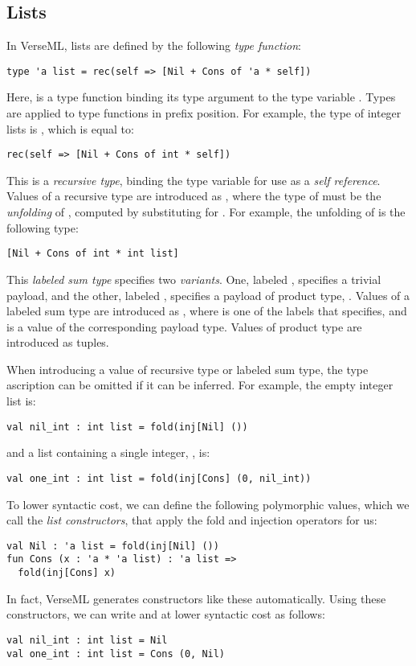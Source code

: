 \subsection{Lists}\label{sec:lists}
In VerseML, lists are defined by the following \emph{type function}:
\begin{lstlisting}[numbers=none]
type 'a list = rec(self => [Nil + Cons of 'a * self])
\end{lstlisting}
Here,  is a {type function} binding its type argument to the type variable . Types are applied to type functions in prefix position. For example, the type of integer lists is , which is equal to:
\begin{lstlisting}[numbers=none]
rec(self => [Nil + Cons of int * self])
\end{lstlisting}
This is a \emph{recursive type}, binding the type variable  for use as a \emph{self reference}. Values of a recursive type  are introduced as , where the type of  must be the \emph{unfolding} of , computed by substituting  for . For example, the unfolding of  is the following type:
\begin{lstlisting}[numbers=none]
[Nil + Cons of int * int list]
\end{lstlisting}
This \emph{labeled sum type} specifies two \emph{variants}. One, labeled , specifies a trivial payload, and the other, labeled , specifies a payload of product type, . Values of a labeled sum type  are introduced as , where  is one of the labels that  specifies, and  is a value of the corresponding payload type. Values of product type are introduced as tuples.

When introducing a value of recursive type or labeled sum type, the type ascription can be omitted if it can be inferred. For example, the empty integer list is:
\begin{lstlisting}[numbers=none]
val nil_int : int list = fold(inj[Nil] ())
\end{lstlisting}
and a list containing a single integer, , is:
\begin{lstlisting}[numbers=none]
val one_int : int list = fold(inj[Cons] (0, nil_int))
\end{lstlisting}

To lower syntactic cost, we can define the following polymorphic values, which we call the \emph{list constructors}, that apply the fold and injection operators for us:
\begin{lstlisting}[numbers=none]
val Nil : 'a list = fold(inj[Nil] ())
fun Cons (x : 'a * 'a list) : 'a list => 
  fold(inj[Cons] x)
\end{lstlisting}
In fact, VerseML generates constructors like these automatically. %
Using these constructors, we can write  and  at lower syntactic cost as follows:
\begin{lstlisting}[numbers=none]
val nil_int : int list = Nil
val one_int : int list = Cons (0, Nil)
\end{lstlisting}

